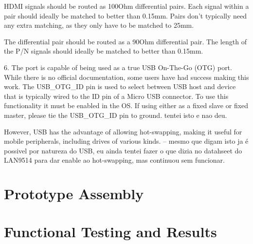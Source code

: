     HDMI signals should be routed as 100Ohm differential pairs. Each signal within a pair should ideally be matched to better than 0.15mm. Pairs don't typically need any extra matching, as they only have to be matched to 25mm.

    The differential pair should be routed as a 90Ohm differential pair. The length of the P/N signals should ideally be matched to better than 0.15mm.

    6. The port is capable of being used as a true USB On-The-Go (OTG) port. While there is no official documentation, some users have had success making this work. The USB\_OTG\_ID pin is used to select between USB host and device that is typically wired to the ID pin of a Micro USB connector. To use this functionality it must be enabled in the OS. If using either as a fixed slave or fixed master, please tie the USB\_OTG\_ID pin to ground. tentei isto e nao deu.


    However, USB has the advantage of allowing hot-swapping, making it useful for mobile peripherals, including drives of various kinds. -- mesmo que digam isto ja é possivel por natureza do USB, eu ainda tentei fazer o que dizia no datahseet do LAN9514 para dar enable ao hot-swapping, mas continuou sem funcionar.

\section{Prototype Assembly}\label{sec:53_PrototypeAssembly}

\section{Functional Testing and Results}\label{sec:54_FunctionalTesting}